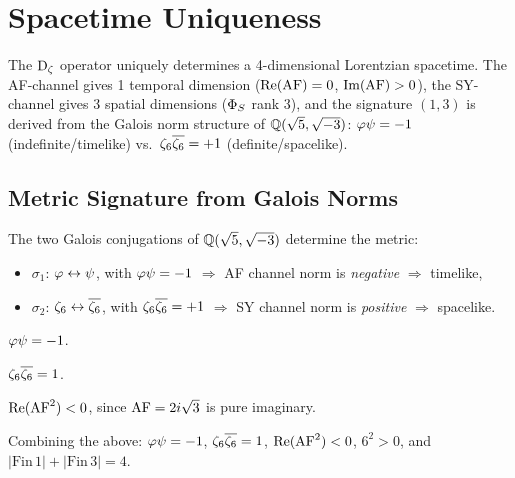 \chapter{Spacetime Uniqueness}
\label{ch:spacetime}

The $\operatorname{D_\zeta}$ operator uniquely determines a 4-dimensional Lorentzian spacetime.
The AF-channel gives 1 temporal dimension ($\operatorname{Re}(\mathrm{AF}) = 0$, $\operatorname{Im}(\mathrm{AF}) > 0$),
the SY-channel gives 3 spatial dimensions ($\Phi_S$ rank 3),
and the signature $(1,3)$ is derived from
the Galois norm structure of $\mathbb{Q}(\sqrt{5},\sqrt{-3})$:
$\varphi\psi = -1$ (indefinite/timelike) vs.\ $\zeta_6\overline{\zeta_6} = +1$ (definite/spacelike).

\section{Metric Signature from Galois Norms}

The two Galois conjugations of $\mathbb{Q}(\sqrt{5},\sqrt{-3})$ determine the metric:
\begin{itemize}
  \item $\sigma_1$: $\varphi \leftrightarrow \psi$, with $\varphi\psi = -1$
    $\Rightarrow$ AF channel norm is \emph{negative} $\Rightarrow$ timelike,
  \item $\sigma_2$: $\zeta_6 \leftrightarrow \overline{\zeta_6}$, with $\zeta_6\overline{\zeta_6} = +1$
    $\Rightarrow$ SY channel norm is \emph{positive} $\Rightarrow$ spacelike.
\end{itemize}

\begin{theorem}
\label{thm:AF-sign}
$\varphi\psi = -1$.
\end{theorem}

\begin{theorem}
\label{thm:SY-sign}
$\zeta_6\overline{\zeta_6} = 1$.
\end{theorem}

\begin{theorem}[$\afcoeff^2 < 0$]
\label{thm:AF-sq-neg}
$\operatorname{Re}(\mathrm{AF}^2) < 0$, since $\mathrm{AF} = 2i\sqrt{3}$ is pure imaginary.
\end{theorem}

\begin{theorem}
\label{thm:signature-Dz}
Combining the above:
$\varphi\psi = -1$, $\zeta_6\overline{\zeta_6} = 1$, $\operatorname{Re}(\mathrm{AF}^2) < 0$, $6^2 > 0$,
and $|{\mathrm{Fin}\,1}| + |{\mathrm{Fin}\,3}| = 4$.
\end{theorem}

